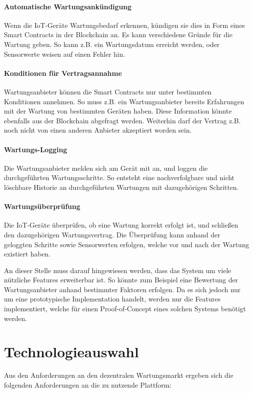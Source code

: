 \paragraph{Automatische Wartungsankündigung}
Wenn die IoT-Geräte Wartungsbedarf erkennen, kündigen sie dies in Form eines Smart Contracts in der Blockchain an. Es kann verschiedene Gründe für die Wartung geben. So kann z.B. ein Wartungsdatum erreicht werden, oder Sensorwerte weisen auf einen Fehler hin.

\paragraph{Konditionen für Vertragsannahme}
Wartungsanbieter können die Smart Contracts nur unter bestimmten Konditionen annehmen. So muss z.B. ein Wartungsanbieter bereits Erfahrungen mit der Wartung von bestimmten Geräten haben. Diese Information könnte ebenfalls aus der Blockchain abgefragt werden. Weiterhin darf der Vertrag z.B. noch nicht von einen anderen Anbieter akzeptiert worden sein. 

\paragraph{Wartungs-Logging}
Die Wartungsanbieter melden sich am Gerät mit an, und loggen die durchgeführten Wartungsschritte. So entsteht eine nachverfolgbare und nicht löschbare Historie an durchgeführten Wartungen mit dazugehörigen Schritten.

\paragraph{Wartungsüberprüfung}
Die IoT-Geräte überprüfen, ob eine Wartung korrekt erfolgt ist, und schließen den dazugehörigen Wartungsvertrag. Die Überprüfung kann anhand der geloggten Schritte sowie Sensorwerten erfolgen, welche vor und nach der Wartung existiert haben.

An dieser Stelle muss darauf hingewiesen werden, dass das System um viele nützliche Features erweiterbar ist. So könnte zum Beispiel eine Bewertung der Wartungsanbieter anhand bestimmter Faktoren erfolgen. Da es sich jedoch nur um eine prototypische Implementation handelt, werden nur die Features implementiert, welche für einen Proof-of-Concept eines solchen Systems benötigt werden.

\section{Technologieauswahl}
Aus den Anforderungen an den dezentralen Wartungsmarkt ergeben sich die folgenden Anforderungen an die zu nutzende Plattform: 

